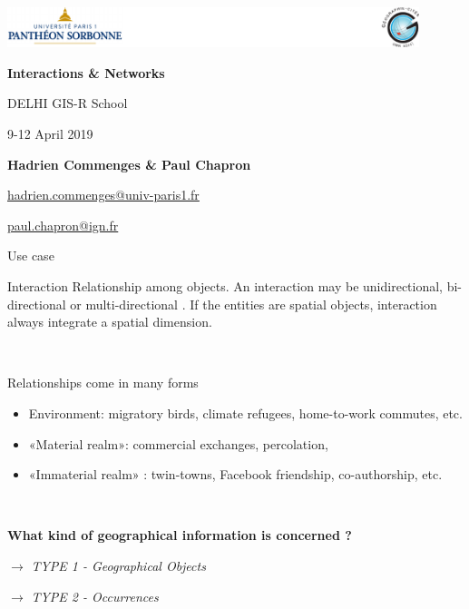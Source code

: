\graphicspath{{IMAGE/}}

\begin{frame}

\includegraphics[width=12cm]{Logos.pdf}

\vfill

\begin{center}

\vspace*{1.5cm}

\LARGE
\textbf{Interactions \& Networks}

\vspace*{1.5cm}
 DELHI GIS-R School


\large
9-12 April 2019

\vspace*{1.5cm}


\textbf{Hadrien Commenges \& Paul Chapron}

{\small

\vspace*{0.1cm}

\url{hadrien.commenges@univ-paris1.fr}

\url{paul.chapron@ign.fr}
}

\end{center}

\end{frame}



\begin{frame}{Use case}

\begin{block}{Interaction}
Relationship among objects.  An interaction may be unidirectional, bi-directional or multi-directional . 
If the entities are spatial objects, interaction always integrate a spatial dimension.
\end{block}

~

Relationships come in many forms

\begin{itemize}
\item Environment: migratory birds, climate refugees, home-to-work commutes, etc.
\item «Material realm»: commercial exchanges, percolation,   
\item «Immaterial realm» : twin-towns, Facebook friendship, co-authorship, etc.
\end{itemize}


~

\textbf{What kind of geographical information is concerned ?}



$\rightarrow$ \textit{TYPE 1 - Geographical Objects}

$\rightarrow$ \textit{TYPE 2 - Occurrences}



\end{frame}



